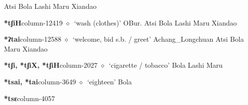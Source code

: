 \hspace{1ex}
         Atsi 
\hspace{1ex}
         Bola 
\hspace{1ex}
         Lashi 
\hspace{1ex}
         Maru 
\hspace{1ex}
         Xiandao 
  \item {\footnotesize \textbf{*tʃiH}}{\tiny column-12419}
         $\diamond$~`wash (clothes)'
         OBur. 
\hspace{1ex}
         Atsi 
\hspace{1ex}
         Bola 
\hspace{1ex}
         Lashi 
\hspace{1ex}
         Maru 
\hspace{1ex}
         Xiandao 
  \item {\footnotesize \textbf{*ʔtai}}{\tiny column-12588}
         $\diamond$~`welcome, bid s.b. / greet'
         Achang\_Longchuan 
\hspace{1ex}
         Atsi 
\hspace{1ex}
         Bola 
\hspace{1ex}
         Maru 
\hspace{1ex}
         Xiandao 
  \item {\footnotesize \textbf{*tʃi, *tʃiX, *tʃiH}}{\tiny column-2027}
         $\diamond$~`cigarette / tobacco'
         Bola 
\hspace{1ex}
         Lashi 
\hspace{1ex}
         Maru 
  \item {\footnotesize \textbf{*tsai, *tai}}{\tiny column-3649}
         $\diamond$~`eighteen'
         Bola 
  \item {\footnotesize \textbf{*tsɛ}}{\tiny column-4057}
